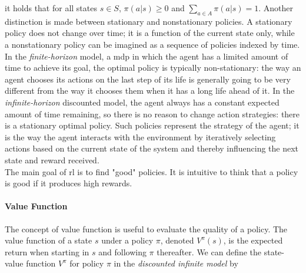 it holds that for all states $s \in S$, $\pi(a|s) \geq 0$ and $\sum_{a \in A} \pi(a|s) = 1$. 
Another distinction is made between stationary and nonstationary policies. A stationary policy
does not change over time; it is a function of the current state only,
while a nonstationary policy can be imagined as a sequence of policies indexed by time. 
In the \emph{finite-horizon} model, a \gls{mdp} in which the agent has a limited amount of time to achieve its goal, 
the optimal policy is typically non-stationary: the way an agent chooses its actions on the last step 
of its life is generally going to be very different from the way it chooses them when it has a long
life ahead of it. In the \emph{infinite-horizon} discounted model, the agent always has a constant
expected amount of time remaining, so there is no reason to change action strategies: there
is a stationary optimal policy.   
Such policies represent the strategy of the agent; it is the way the agent interacts with the environment
by iteratively selecting actions based on the current state of the system and thereby influencing the next state and 
reward received. \\
The main goal of \gls{rl} is to find "good" policies. It is intuitive to think that a policy is good 
if it produces high rewards.


\paragraph{Value Function} The concept of value function is useful to evaluate the 
quality of a policy. The value function of a state \(s\) under a policy \(\pi\), denoted \(V^{\pi}(s)\), 
is the expected return when starting in \(s\) and following \(\pi\) thereafter. 
We can define the state-value function  \(V^{\pi}\) for policy \(\pi\) in the \emph{discounted infinite model} 
by

